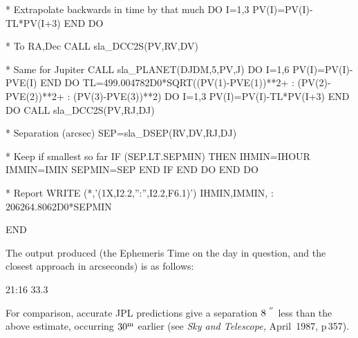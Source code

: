 \documentclass[11pt,twoside,nolof]{starlink}
\providecommand{\arcseci}[1] {$#1\hspace{-0.05em}$\raisebox{-0.5ex}
                         {$^{'\hspace{-0.1em}'}$}}
\begin{document}
\begin{terminalv}
      *        Extrapolate backwards in time by that much
                  DO I=1,3
                     PV(I)=PV(I)-TL*PV(I+3)
                  END DO

      *        To RA,Dec
                  CALL sla_DCC2S(PV,RV,DV)

      *        Same for Jupiter
                  CALL sla_PLANET(DJDM,5,PV,J)
                  DO I=1,6
                     PV(I)=PV(I)-PVE(I)
                  END DO
                  TL=499.004782D0*SQRT((PV(1)-PVE(1))**2+
           :                           (PV(2)-PVE(2))**2+
           :                           (PV(3)-PVE(3))**2)
                  DO I=1,3
                     PV(I)=PV(I)-TL*PV(I+3)
                  END DO
                  CALL sla_DCC2S(PV,RJ,DJ)

      *        Separation (arcsec)
                  SEP=sla_DSEP(RV,DV,RJ,DJ)

      *        Keep if smallest so far
                  IF (SEP.LT.SEPMIN) THEN
                     IHMIN=IHOUR
                     IMMIN=IMIN
                     SEPMIN=SEP
                  END IF
               END DO
            END DO

      *  Report
            WRITE (*,'(1X,I2.2,'':'',I2.2,F6.1)') IHMIN,IMMIN,
           :                                      206264.8062D0*SEPMIN

            END
\end{terminalv}
\goodbreak
The output produced (the Ephemeris Time on the day in question, and
the closest approach in arcseconds) is as follows:
\goodbreak
\begin{terminalv}
      21:16  33.3
\end{terminalv}
\goodbreak
For comparison, accurate JPL predictions
give a separation \arcseci{8} less than
the above estimate, occurring $30^{\rm m}$ earlier
(see \textit{Sky and Telescope,}\/ April~1987, p\,357).
\end{document}
